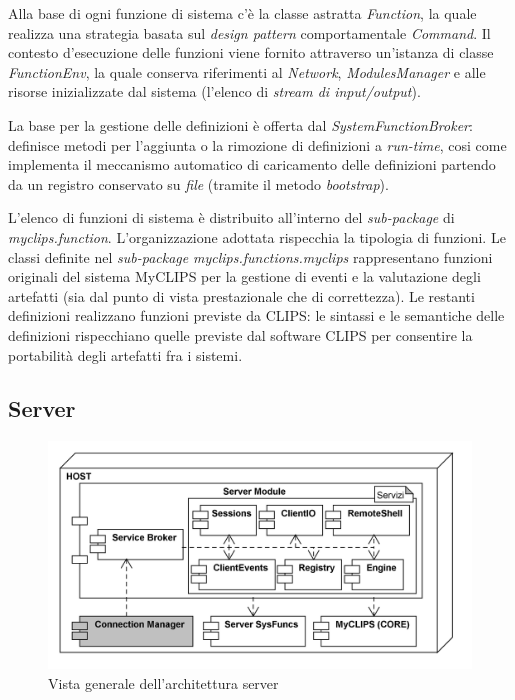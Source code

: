 Alla base di ogni funzione di sistema c'è la classe astratta \emph{Function}, la quale realizza una strategia basata sul \emph{design pattern} comportamentale \emph{Command}. Il contesto d'esecuzione delle funzioni viene fornito attraverso un'istanza di classe \emph{FunctionEnv}, la quale conserva riferimenti al \emph{Network}, \emph{ModulesManager} e alle risorse inizializzate dal sistema (l'elenco di \emph{stream di input/output}).

La base per la gestione delle definizioni è offerta dal \emph{SystemFunctionBroker}: definisce metodi per l'aggiunta o la rimozione di definizioni a \emph{run-time}, cosi come implementa il meccanismo automatico di caricamento delle definizioni partendo da un registro conservato su \emph{file} (tramite il metodo \emph{bootstrap}).

L'elenco di funzioni di sistema è distribuito all'interno del \emph{sub-package} di \emph{myclips.function}. L'organizzazione adottata rispecchia la tipologia di funzioni. Le classi definite nel \emph{sub-package} \emph{myclips.functions.myclips} rappresentano funzioni originali del sistema MyCLIPS per la gestione di eventi e la valutazione degli artefatti (sia dal punto di vista prestazionale che di correttezza). Le restanti definizioni realizzano funzioni previste da CLIPS: le sintassi e le semantiche delle definizioni rispecchiano quelle previste dal software CLIPS per consentire la portabilità degli artefatti fra i sistemi.

\subsection{Server}

\begin{figure}[h]
\centering
\includegraphics[width=1\textwidth]{Immagini/Capitolo3/Deployment/Server.png}
\caption{Vista generale dell'architettura server}\label{fig:architettura-server}
\end{figure}

